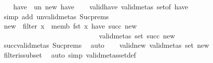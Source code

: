 \begin{isabellebody}
\ \ \isamarkupfalse%
\ {\isacharquery}{\kern0pt}have{\isacharprime}{\kern0pt}\ {\isacharequal}{\kern0pt}\ {\isachardoublequoteopen}un\ new\ have{\isachardoublequoteclose}\isanewline
\ \ \isamarkupfalse%
\ valid{\isacharunderscore}{\kern0pt}have{\isacharprime}{\kern0pt}{\isacharcolon}{\kern0pt}\ {\isachardoublequoteopen}valid{\isacharunderscore}{\kern0pt}metas\ {\isacharparenleft}{\kern0pt}set{\isacharunderscore}{\kern0pt}of\ {\isacharquery}{\kern0pt}have{\isacharprime}{\kern0pt}{\isacharparenright}{\kern0pt}{\isachardoublequoteclose}\ \isamarkupfalse%
\ {\isacharparenleft}{\kern0pt}simp\ add{\isacharcolon}{\kern0pt}\ un{\isacharunderscore}{\kern0pt}valid{\isacharunderscore}{\kern0pt}metas\ Suc{\isachardot}{\kern0pt}prems{\isacharparenright}{\kern0pt}\isanewline
\ \ \isamarkupfalse%
\ {\isacharquery}{\kern0pt}new{\isacharprime}{\kern0pt}\ {\isacharequal}{\kern0pt}\ {\isachardoublequoteopen}filter\ {\isacharparenleft}{\kern0pt}{\isasymlambda}x{\isachardot}{\kern0pt}\ {\isasymnot}\ memb\ {\isacharparenleft}{\kern0pt}fst\ x{\isacharparenright}{\kern0pt}\ {\isacharquery}{\kern0pt}have{\isacharprime}{\kern0pt}{\isacharparenright}{\kern0pt}\ {\isacharparenleft}{\kern0pt}succ\ new{\isacharparenright}{\kern0pt}{\isachardoublequoteclose}\ \ \ \ \ \ \ \ \ \ \ \ \ \ \ \ \ \ \ \ \ \ \ \ \ \ \ \ \ \ \ \ \ \ \ \ \ \ \ \ \ \ \ \ \ \ \ \ \ \ \ \ \ \ \ \ \isanewline
\ \ \isamarkupfalse%
\ {\isachardoublequoteopen}valid{\isacharunderscore}{\kern0pt}metas\ {\isacharparenleft}{\kern0pt}set\ {\isacharparenleft}{\kern0pt}succ\ new{\isacharparenright}{\kern0pt}{\isacharparenright}{\kern0pt}{\isachardoublequoteclose}\ \isamarkupfalse%
\ succ{\isacharunderscore}{\kern0pt}valid{\isacharunderscore}{\kern0pt}metas\ Suc{\isachardot}{\kern0pt}prems\ \isamarkupfalse%
\ auto\isanewline
\ \ \isamarkupfalse%
\ valid{\isacharunderscore}{\kern0pt}new{\isacharprime}{\kern0pt}{\isacharcolon}{\kern0pt}\ {\isachardoublequoteopen}valid{\isacharunderscore}{\kern0pt}metas\ {\isacharparenleft}{\kern0pt}set\ {\isacharquery}{\kern0pt}new{\isacharprime}{\kern0pt}{\isacharparenright}{\kern0pt}{\isachardoublequoteclose}\ \isamarkupfalse%
\ filter{\isacharunderscore}{\kern0pt}is{\isacharunderscore}{\kern0pt}subset\ \isamarkupfalse%
\ {\isacharparenleft}{\kern0pt}auto\ simp{\isacharcolon}{\kern0pt}\ valid{\isacharunderscore}{\kern0pt}metas{\isacharunderscore}{\kern0pt}set{\isacharunderscore}{\kern0pt}def{\isacharparenright}{\kern0pt}\isanewline

\end{isabellebody}

